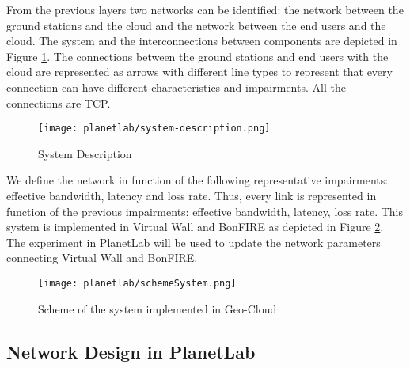 From the previous layers two networks can be identified: the network between the
ground stations and the cloud and the network between the end users and the
cloud. The system and the interconnections between components are depicted in
Figure \ref{fig:ple-system-description}. The connections between the ground stations and end users with the
cloud are represented as arrows with different line types to represent that
every connection can have different characteristics and impairments. All the
connections are TCP.

\begin{figure}[!h]
\begin{center}
\texttt{[image: planetlab/system-description.png]}

\caption{System Description}
\label{fig:ple-system-description}
\end{center}
\end{figure}

We define the network in function of the following representative impairments: effective bandwidth, latency and loss rate. Thus, every link is represented in function of the previous impairments: effective bandwidth, latency, loss rate.
This system is implemented in Virtual Wall and BonFIRE as depicted in Figure \ref{fig:ple-scheme-system}. The experiment in PlanetLab will be used to update the network parameters connecting Virtual Wall and BonFIRE.
\begin{figure}[!h]
\begin{center}
\texttt{[image: planetlab/schemeSystem.png]}
\caption{Scheme of the system implemented in Geo-Cloud}
\label{fig:ple-scheme-system}
\end{center}
\end{figure}


\subsection{Network Design in PlanetLab}

